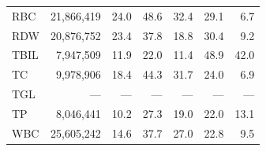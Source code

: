 \begin{table}[ht]
\begin{tabular}{lrrrrrr}
RBC & 21,866,419 & 24.0 & 48.6 & 32.4 & 29.1 & 6.7 \\
RDW & 20,876,752 & 23.4 & 37.8 & 18.8 & 30.4 & 9.2 \\
TBIL & 7,947,509 & 11.9 & 22.0 & 11.4 & 48.9 & 42.0 \\
TC & 9,978,906 & 18.4 & 44.3 & 31.7 & 24.0 & 6.9 \\
TGL & --- & --- & --- & --- & --- & --- \\
TP & 8,046,441 & 10.2 & 27.3 & 19.0 & 22.0 & 13.1 \\
WBC & 25,605,242 & 14.6 & 37.7 & 27.0 & 22.8 & 9.5 \\
\bottomrule
\end{tabular}
\label{tab:07_prevalence_detail_chs}
\end{table}